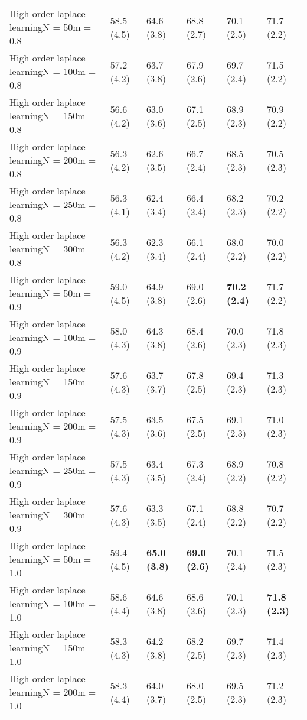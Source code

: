 \documentclass{article}
\begin{document}
\begin{table*}[t!]
\begin{center}
\begin{small}
\begin{sc}
\begin{tabular}{llllll}
High order laplace learningN = 50m = 0.8&58.5 (4.5)      &64.6 (3.8)      &68.8 (2.7)      &70.1 (2.5)      &71.7 (2.2)      \\
High order laplace learningN = 100m = 0.8&57.2 (4.2)      &63.7 (3.8)      &67.9 (2.6)      &69.7 (2.4)      &71.5 (2.2)      \\
High order laplace learningN = 150m = 0.8&56.6 (4.2)      &63.0 (3.6)      &67.1 (2.5)      &68.9 (2.3)      &70.9 (2.2)      \\
High order laplace learningN = 200m = 0.8&56.3 (4.2)      &62.6 (3.5)      &66.7 (2.4)      &68.5 (2.3)      &70.5 (2.3)      \\
High order laplace learningN = 250m = 0.8&56.3 (4.1)      &62.4 (3.4)      &66.4 (2.4)      &68.2 (2.3)      &70.2 (2.2)      \\
High order laplace learningN = 300m = 0.8&56.3 (4.2)      &62.3 (3.4)      &66.1 (2.4)      &68.0 (2.2)      &70.0 (2.2)      \\
High order laplace learningN = 50m = 0.9&59.0 (4.5)      &64.9 (3.8)      &69.0 (2.6)      &{\bf 70.2 (2.4)}&71.7 (2.2)      \\
High order laplace learningN = 100m = 0.9&58.0 (4.3)      &64.3 (3.8)      &68.4 (2.6)      &70.0 (2.3)      &71.8 (2.3)      \\
High order laplace learningN = 150m = 0.9&57.6 (4.3)      &63.7 (3.7)      &67.8 (2.5)      &69.4 (2.3)      &71.3 (2.3)      \\
High order laplace learningN = 200m = 0.9&57.5 (4.3)      &63.5 (3.6)      &67.5 (2.5)      &69.1 (2.3)      &71.0 (2.3)      \\
High order laplace learningN = 250m = 0.9&57.5 (4.3)      &63.4 (3.5)      &67.3 (2.4)      &68.9 (2.2)      &70.8 (2.2)      \\
High order laplace learningN = 300m = 0.9&57.6 (4.3)      &63.3 (3.5)      &67.1 (2.4)      &68.8 (2.2)      &70.7 (2.2)      \\
High order laplace learningN = 50m = 1.0&59.4 (4.5)      &{\bf 65.0 (3.8)}&{\bf 69.0 (2.6)}&70.1 (2.4)      &71.5 (2.3)      \\
High order laplace learningN = 100m = 1.0&58.6 (4.4)      &64.6 (3.8)      &68.6 (2.6)      &70.1 (2.3)      &{\bf 71.8 (2.3)}\\
High order laplace learningN = 150m = 1.0&58.3 (4.3)      &64.2 (3.8)      &68.2 (2.5)      &69.7 (2.3)      &71.4 (2.3)      \\
High order laplace learningN = 200m = 1.0&58.3 (4.4)      &64.0 (3.7)      &68.0 (2.5)      &69.5 (2.3)      &71.2 (2.3)      \\

\end{tabular}
\end{sc}
\end{small}
\end{center}
\end{table*}
\end{document}
